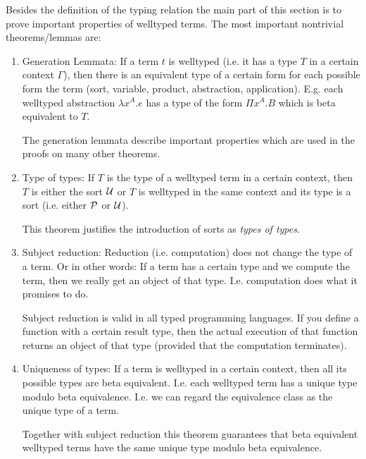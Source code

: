 Besides the definition of the typing relation the main part of this section is
to prove important properties of welltyped terms. The most important nontrivial
theorems/lemmas are:
\begin{enumerate}
    \item Generation Lemmata: If a term $t$ is welltyped (i.e. it has a type $T$
        in a certain context $\Gamma$), then there is an equivalent type of a
        certain form for each possible form the term (sort, variable, product,
        abstraction, application). E.g. each welltyped abstraction $\lambda x^A.
        e$ has a type of the form $\Pi x^A. B$ which is beta equivalent to $T$.

        The generation lemmata describe important properties which are used in
        the proofs on many other theorems.

    \item Type of types: If $T$ is the type of a welltyped term in a certain
        context, then $T$ is either the sort ${\cal U}$ or $T$ is welltyped in the
        same context and its type is a sort (i.e. either ${\cal P}$ or ${\cal U}$).

        This theorem justifies the introduction of sorts as \emph{types of
        types}.

    \item Subject reduction: Reduction (i.e. computation) does not change
        the type of a term. Or in other words: If a term has a certain type and
        we compute the term, then we really get an object of that type. I.e.
        computation does what it promises to do.

        Subject reduction is valid in all typed programming languages. If you
        define a function with a certain result type, then the actual execution
        of that function returns an object of that type (provided that the
        computation terminates).

    \item Uniqueness of types: If a term is welltyped in a certain context, then
        all its possible types are beta equivalent. I.e. each welltyped term has
        a unique type modulo beta equivalence. I.e. we can regard the
        equivalence class as the unique type of a term.

        Together with subject reduction this theorem guarantees that beta
        equivalent welltyped terms have the same unique type modulo beta
        equivalence.
\end{enumerate}

